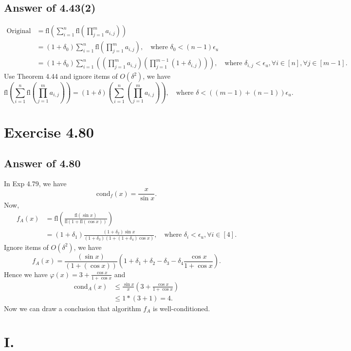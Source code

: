 \documentclass[a4paper]{article}
\begin{document}
\subsection*{Answer of 4.43(2)}
\begin{align*}
    \text{Original formula}&=\text{fl}(\sum_{i=1}^{n} \text{fl}(\prod_{j=1}^{m}a_{i,j}))\\
    &=(1+\delta_0) \sum_{i=1}^{n} \text{fl}(\prod_{j=1}^{m}a_{i,j}),\quad \text{where } \delta_0<(n-1)\epsilon_u\\
    &=(1+\delta_0)\sum_{i=1}^{n} ((\prod_{j=1}^{m}a_{i,j})(\prod_{j=1}^{m-1}(1+\delta_{i,j}))),\quad \text{where } \delta_{i,j}<\epsilon_u, \forall i \in [n], \forall j \in [m-1].
\end{align*}
Use Theorem 4.44 \cite{Trm4_44} and ignore items of $O(\delta^2)$, we have 
$$\text{fl}(\sum_{i=1}^{n} \text{fl}(\prod_{j=1}^{m}a_{i,j}))=(1+\delta)(\sum_{i=1}^{n} (\prod_{j=1}^{m}a_{i,j})),\quad \text{where } \delta<((m-1)+(n-1))\epsilon_u.$$

\section*{Exercise 4.80}

\subsection*{Answer of 4.80}
In Exp 4.79, we have $$\text{cond}_f(x)=\frac{x}{\sin x}.$$
Now,
\begin{align*}
    f_A(x)&=\text{fl}(\frac{\text{fl}(\sin x)}{\text{fl}(1+\text{fl}(\cos x))})\\
    &=(1+\delta_1)\frac{(1+\delta_2)\sin x}{(1+\delta_3)(1+(1+\delta_4)\cos x)},\quad \text{where }\delta_i<\epsilon_u,\forall i \in [4].
\end{align*}
Ignore items of $O(\delta^2)$, we have
$$f_A(x)=\frac{(\sin x)}{(1+(\cos x))}(1+\delta_1+\delta_2-\delta_3-\delta_4\frac{\cos x}{1+\cos x}).$$
Hence we have $\varphi(x)=3+\frac{\cos x}{1+\cos x}$ and 
\begin{align*}
    \text{cond}_A(x) &\leq \frac{\sin x}{x}(3+\frac{\cos x}{1+\cos x})\\
    &\leq 1*(3+1)=4.
\end{align*}
Now we can draw a conclusion that algorithm $f_A$ is well-conditioned.

\section*{I.}
\end{document}
